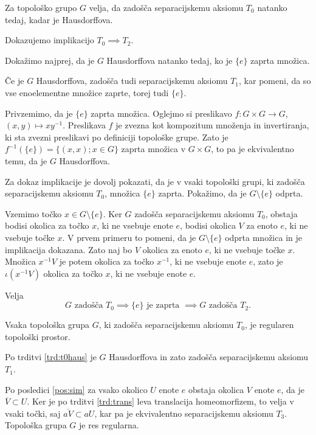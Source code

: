 \documentclass[mat1]{fmfdelo}
\newcommand{\closure}[1]{\overline{#1}}
\begin{document}
\begin{trditev}\label{trd:t0haus}
Za topološko grupo $G$ velja, da zadošča separacijskemu aksiomu $T_0$ natanko tedaj, kadar je Hausdorffova.
\end{trditev}

\begin{dokaz}
Dokazujemo implikacijo $T_0 \implies T_2$.

Dokažimo najprej, da je $G$ Hausdorffova natanko tedaj, ko je $\lbrace e \rbrace$ zaprta množica.

Če je $G$ Hausdorffova, zadošča tudi separacijskemu aksiomu $T_1$, kar pomeni, da so vse enoelementne množice zaprte, torej tudi $\lbrace e \rbrace$.

Privzemimo, da je $\lbrace e \rbrace$ zaprta množica. Oglejmo si preslikavo $f\colon G \times G \to G$, $(x, y) \mapsto xy^{-1}$. Preslikava $f$ je zvezna kot kompozitum množenja in invertiranja, ki sta zvezni preslikavi po definiciji topološke grupe. Zato je $f^{-1}(\lbrace e \rbrace) = \lbrace (x, x) ; x \in G \rbrace$ zaprta množica v $G \times G$, to pa je ekvivalentno temu, da je $G$ Hausdorffova.

Za dokaz implikacije je dovolj pokazati, da je v vsaki topološki grupi, ki zadošča separacijskemu aksiomu $T_0$, množica $\lbrace e \rbrace$ zaprta. Pokažimo, da je $G\setminus\lbrace e \rbrace$ odprta.

Vzemimo točko $x \in G\setminus\lbrace e \rbrace$. Ker $G$ zadošča separacijskemu aksiomu $T_0$, obstaja bodisi okolica za točko $x$, ki ne vsebuje enote $e$, bodisi okolica $V$ za enoto $e$, ki ne vsebuje točke $x$. V prvem primeru to pomeni, da je $G\setminus\lbrace e \rbrace$ odprta množica in je implikacija dokazana. Zato naj bo $V$ okolica za enoto $e$, ki ne vsebuje točke $x$. Množica $x^{-1}V$ je potem okolica za točko $x^{-1}$, ki ne vsebuje enote $e$, zato je $\iota(x^{-1}V)$ okolica za točko $x$, ki ne vsebuje enote $e$.

Velja \[G \text{ zadošča } T_0 \implies \lbrace e \rbrace \text{ je zaprta } \implies G \text{ zadošča } T_2. \]
\end{dokaz}

\begin{izrek}\label{izr:t3}
	Vsaka topološka grupa $G$, ki zadošča separacijskemu aksiomu $T_0$, je regularen topološki prostor.
\end{izrek}

\begin{dokaz}
Po trditvi \ref{trd:t0haus} je $G$ Hausdorffova in zato zadošča separacijskemu aksiomu $T_1$.

Po posledici \ref{pos:sim} za vsako okolico $U$ enote $e$ obstaja okolica $V$ enote $e$, da je $\closure{V} \subset U$. Ker je po trditvi \ref{trd:trans} leva translacija homeomorfizem, to velja v vsaki točki, saj $\closure{aV} \subset aU$, kar pa je ekvivalentno separacijskemu aksiomu $T_3$. Topološka grupa $G$ je res regularna.
\end{dokaz}
\end{document}
